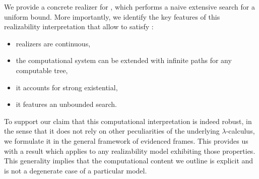 \documentclass[a4paper,UKenglish,cleveref, autoref, thm-restate]{lipics-v2021}
\begin{document}
We provide a concrete realizer for \FT, which performs a naive extensive search for
a uniform bound. More importantly, we identify the key features of this realizability
interpretation that allow to satisfy \FT:
\begin{itemize}
\item realizers are continuous,
\item the computational system can be extended with infinite paths
for any computable tree,
\item it accounts for strong existential,
\item it features an unbounded search.
\end{itemize}
To support our claim that this computational interpretation is indeed robust, in
the sense that it does not rely on other peculiarities of the underlying $\lambda$-calculus,
we formulate it in the general framework of evidenced frames.
This provides us with a result which applies to any realizability model
exhibiting those properties.
This generality implies that the computational content we outline
is explicit and is not a degenerate case of a particular model.
\end{document}
